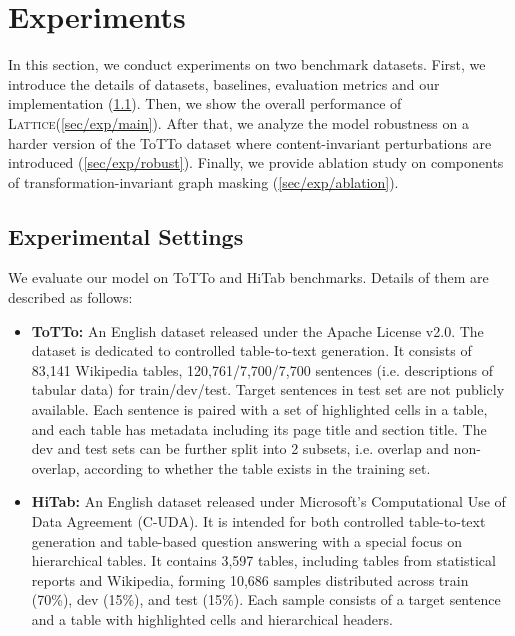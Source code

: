 \documentclass[11pt]{article}
\newcommand{\stitle}[1]{\vspace{1ex} \noindent{\bf #1.}}
\newcommand{\model}{\mbox{\textsc{Lattice}}\xspace}
\begin{document}
 


\section{Experiments}
In this section, we conduct experiments on two benchmark datasets. 
First, we introduce the details of datasets, baselines, evaluation metrics and our implementation (\cref{sec/exp/setting}).
Then, we show the overall performance of \model (\cref{sec/exp/main}).
After that, we analyze the model robustness on a harder version of the ToTTo dataset where content-invariant perturbations are introduced (\cref{sec/exp/robust}).
Finally, we provide ablation study on components of transformation-invariant graph masking (\cref{sec/exp/ablation}).

\subsection{Experimental Settings}
\label{sec/exp/setting}

\stitle{Datasets}
We evaluate our model on ToTTo \citep{parikh2020totto} and HiTab \citep{cheng2021hitab} benchmarks.
Details of them are described as follows: 

\begin{itemize}[leftmargin=*]
\setlength\itemsep{-0.1em}
\item \textbf{ToTTo:} 
An English dataset released under the Apache License v2.0. The dataset is dedicated to controlled table-to-text generation.
It consists of 83,141 Wikipedia tables, 120,761/7,700/7,700 sentences (i.e. descriptions of tabular data) for train/dev/test. 
Target sentences in test set are not publicly available. 
Each sentence is paired with a set of highlighted cells in a table, and each table has metadata including its page title and section title.
The dev and test sets can be further split into 2 subsets, i.e. overlap and non-overlap, according to whether the table exists in the training set.
\item \textbf{HiTab:}
An English dataset released under Microsoft's Computational Use of Data Agreement (C-UDA). It is intended for both controlled table-to-text generation and table-based question answering with a special focus on hierarchical tables.
It contains 3,597 tables, including tables from statistical reports and Wikipedia, forming 10,686 samples distributed across train (70\%), dev (15\%), and test (15\%).
Each sample consists of a target sentence and a table with highlighted cells and hierarchical headers.
\end{itemize}
\end{document}
